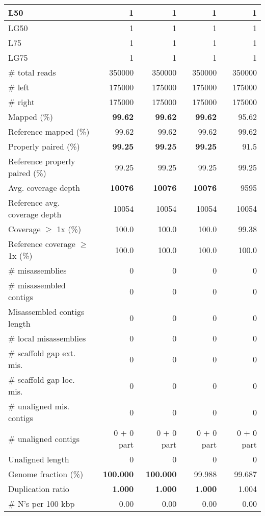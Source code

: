 \documentclass[12pt,a4paper]{article}
\begin{document}
\begin{table}[ht]
\begin{center}
\begin{tabular}{|l*{4}{|r}|}
L50 & 1 & 1 & 1 & 1 \\ \hline
LG50 & 1 & 1 & 1 & 1 \\ \hline
L75 & 1 & 1 & 1 & 1 \\ \hline
LG75 & 1 & 1 & 1 & 1 \\ \hline
\# total reads & 350000 & 350000 & 350000 & 350000 \\ \hline
\# left & 175000 & 175000 & 175000 & 175000 \\ \hline
\# right & 175000 & 175000 & 175000 & 175000 \\ \hline
Mapped (\%) & {\bf 99.62} & {\bf 99.62} & {\bf 99.62} & 95.62 \\ \hline
Reference mapped (\%) & 99.62 & 99.62 & 99.62 & 99.62 \\ \hline
Properly paired (\%) & {\bf 99.25} & {\bf 99.25} & {\bf 99.25} & 91.5 \\ \hline
Reference properly paired (\%) & 99.25 & 99.25 & 99.25 & 99.25 \\ \hline
Avg. coverage depth & {\bf 10076} & {\bf 10076} & {\bf 10076} & 9595 \\ \hline
Reference avg. coverage depth & 10054 & 10054 & 10054 & 10054 \\ \hline
Coverage $\geq$ 1x (\%) & 100.0 & 100.0 & 100.0 & 99.38 \\ \hline
Reference coverage $\geq$ 1x (\%) & 100.0 & 100.0 & 100.0 & 100.0 \\ \hline
\# misassemblies & 0 & 0 & 0 & 0 \\ \hline
\# misassembled contigs & 0 & 0 & 0 & 0 \\ \hline
Misassembled contigs length & 0 & 0 & 0 & 0 \\ \hline
\# local misassemblies & 0 & 0 & 0 & 0 \\ \hline
\# scaffold gap ext. mis. & 0 & 0 & 0 & 0 \\ \hline
\# scaffold gap loc. mis. & 0 & 0 & 0 & 0 \\ \hline
\# unaligned mis. contigs & 0 & 0 & 0 & 0 \\ \hline
\# unaligned contigs & 0 + 0 part & 0 + 0 part & 0 + 0 part & 0 + 0 part \\ \hline
Unaligned length & 0 & 0 & 0 & 0 \\ \hline
Genome fraction (\%) & {\bf 100.000} & {\bf 100.000} & 99.988 & 99.687 \\ \hline
Duplication ratio & {\bf 1.000} & {\bf 1.000} & {\bf 1.000} & 1.004 \\ \hline
\# N's per 100 kbp & 0.00 & 0.00 & 0.00 & 0.00 \\ \hline

\end{tabular}
\end{center}
\end{table}
\end{document}
